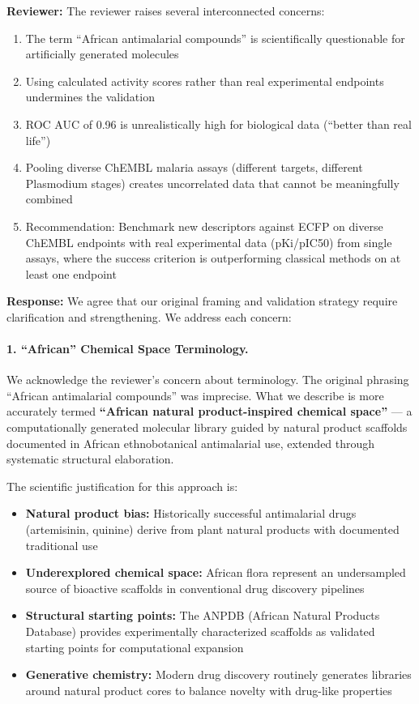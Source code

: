 \documentclass[11pt]{article}
\begin{document}
\textbf{Reviewer:} The reviewer raises several interconnected concerns:
\begin{enumerate}[leftmargin=1.6em]
\item The term ``African antimalarial compounds'' is scientifically questionable for 
artificially generated molecules
\item Using calculated activity scores rather than real experimental endpoints undermines 
the validation
\item ROC AUC of 0.96 is unrealistically high for biological data (``better than real life'')
\item Pooling diverse ChEMBL malaria assays (different targets, different Plasmodium stages) 
creates uncorrelated data that cannot be meaningfully combined
\item Recommendation: Benchmark new descriptors against ECFP on diverse ChEMBL endpoints 
with real experimental data (pKi/pIC50) from single assays, where the success criterion 
is outperforming classical methods on at least one endpoint
\end{enumerate}

\textbf{Response:} We agree that our original framing and validation strategy require 
clarification and strengthening. We address each concern:

\paragraph{1. ``African'' Chemical Space Terminology.}
We acknowledge the reviewer's concern about terminology. The original phrasing 
``African antimalarial compounds'' was imprecise. What we describe is more accurately 
termed \textbf{``African natural product-inspired chemical space''} — a computationally 
generated molecular library guided by natural product scaffolds documented in African 
ethnobotanical antimalarial use, extended through systematic structural elaboration.

The scientific justification for this approach is:
\begin{itemize}[leftmargin=1.6em]
\item \textbf{Natural product bias:} Historically successful antimalarial drugs 
(artemisinin, quinine) derive from plant natural products with documented traditional use
\item \textbf{Underexplored chemical space:} African flora represent an undersampled 
source of bioactive scaffolds in conventional drug discovery pipelines
\item \textbf{Structural starting points:} The ANPDB (African Natural Products Database) 
provides experimentally characterized scaffolds as validated starting points for 
computational expansion
\item \textbf{Generative chemistry:} Modern drug discovery routinely generates libraries 
around natural product cores to balance novelty with drug-like properties
\end{itemize}
\end{document}
